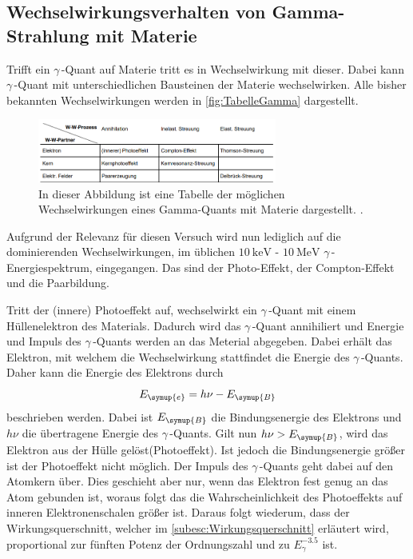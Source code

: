 \subsection{Wechselwirkungsverhalten von Gamma-Strahlung mit Materie}
\label{Gammawechselwirkung}
Trifft ein $\gamma$\,-Quant auf Materie tritt es in Wechselwirkung mit dieser. Dabei kann $\gamma$\,-Quant mit unterschiedlichen Bausteinen der Materie wechselwirken. 
Alle bisher bekannten Wechselwirkungen werden in \autoref{fig:TabelleGamma} dargestellt.

\begin{figure}
    \centering
    \includegraphics[width = 0.7\textwidth]{content/TabelleGamma.png}
    \caption{In dieser Abbildung ist eine Tabelle der möglichen Wechselwirkungen eines Gamma-Quants mit Materie dargestellt. \cite{v704}.}
    \label{fig:TabelleGamma}
\end{figure}

Aufgrund der Relevanz für diesen Versuch wird nun lediglich auf die dominierenden Wechselwirkungen, im üblichen $\qty{10}{\kilo\electronvolt}$ - $\qty{10}{\mega\electronvolt}$
$\gamma$\,-Energiespektrum, eingegangen. Das sind der Photo-Effekt, der Compton-Effekt und die Paarbildung.


Tritt der (innere) Photoeffekt auf, wechselwirkt ein $\gamma$\,-Quant mit einem Hüllenelektron des Materials. Dadurch wird das $\gamma$\,-Quant annihiliert und Energie und 
Impuls des $\gamma$\,-Quants werden an das Meterial abgegeben. Dabei erhält das Elektron, mit welchem die Wechselwirkung stattfindet die Energie des $\gamma$\,-Quants.
Daher kann die Energie des Elektrons durch 
\begin{equation*}
    E_{\symup{e}} = h\nu - E_{\symup{B}}
\end{equation*}
beschrieben werden. Dabei ist $E_{\symup{B}}$ die Bindungsenergie des Elektrons und $h\nu$ die übertragene Energie des $\gamma$\,-Quants. Gilt nun $h\nu > E_{\symup{B}}$, wird
das Elektron aus der Hülle gelöst(Photoeffekt). Ist jedoch die Bindungsenergie größer ist der Photoeffekt nicht möglich.  Der Impuls des $\gamma$\,-Quants geht dabei auf den 
Atomkern über. Dies geschieht aber nur, wenn das Elektron fest genug an das Atom gebunden ist, woraus folgt das die Wahrscheinlichkeit des Photoeffekts auf inneren 
Elektronenschalen größer ist. Daraus folgt wiederum, dass der Wirkungsquerschnitt, welcher im \autoref{subesc:Wirkungsquerschnitt} erläutert wird, proportional zur fünften 
Potenz der Ordnungszahl und zu $E_\gamma^{-3.5}$ ist.


